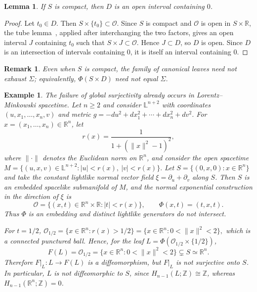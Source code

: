 \documentclass[11pt]{article}
\numberwithin{equation}{section}
\newtheorem{lemma}[theorem]{Lemma}
\newtheorem{remark}[theorem]{Remark}
\newtheorem{example}[theorem]{Example}
\begin{document}
	\begin{lemma}\label{lemma:compact-common-domain}
		If $S$ is compact, then $D$ is an open interval containing $0$.
	\end{lemma}

	\begin{proof}
		Let $t_0\in D$. Then $S\times\{t_0\}\subset\mathscr O$. Since $S$ is
		compact and $\mathscr O$ is open in $S\times\mathbb R$, the tube
		lemma~\cite[Lem.~26.8]{Munkres}, applied after interchanging the two
		factors, gives an open interval $J$ containing $t_0$ such that
		$S\times J\subset\mathscr O$. Hence $J\subset D$, so $D$ is open.
		Since $D$ is an intersection of intervals containing $0$, it is itself
		an interval containing $0$.
	\end{proof}

	\begin{remark}\normalfont
		Even when $S$ is compact, the family of canonical leaves need not
		exhaust $\Sigma$; equivalently, $\Phi(S\times D)$ need not equal
		$\Sigma$.
	\end{remark}

	\begin{example}\label{example:nonuniform-leaf-domain}
		\normalfont
		The failure of global surjectivity already occurs in Lorentz--Minkowski
spacetime. Let $n\ge2$ and consider $\mathbb L^{n+2}$ with coordinates
$(u,x_1,\ldots,x_n,v)$ and metric
\(g=-du^2+dx_1^2+\cdots+dx_n^2+dv^2\).
For \(x=(x_1,\ldots,x_n)\in\mathbb R^n\), let
\[
 r(x)=\frac{1}{1+(\|x\|^2-1)^2},
\]
where $\|\cdot\|$ denotes the Euclidean norm on $\mathbb R^n$, and consider
the open spacetime
\(
M=\{(u,x,v)\in\mathbb L^{n+2}:|u|<r(x),\ |v|<r(x)\}.
\)
Let \(S=\{(0,x,0):x\in\mathbb R^n\}\) and take the constant lightlike
normal vector field \(\xi=\partial_u+\partial_v\) along $S$. Then $S$ is
an embedded spacelike submanifold of $M$, and the normal exponential
construction in the direction of $\xi$ is
\[
 \mathscr O
 =
 \{(x,t)\in\mathbb R^n\times\mathbb R:|t|<r(x)\},
 \qquad
 \Phi(x,t)=(t,x,t).
\]
Thus $\Phi$ is an embedding and distinct lightlike generators do not
intersect.

For $t=1/2$,
\(
\mathscr O_{1/2}
=\{x\in\mathbb R^n:r(x)>1/2\}
=\{x\in\mathbb R^n:0<\|x\|^2<2\},
\)
which is a connected punctured ball. Hence, for the leaf
\(L=\Phi(\mathscr O_{1/2}\times\{1/2\})\),
\[
 F(L)=\mathscr O_{1/2}
 =\{x\in\mathbb R^n:0<\|x\|^2<2\}
 \subsetneq S\simeq\mathbb R^n.
\]
Therefore $F|_L\colon L\to F(L)$ is a diffeomorphism, but $F|_L$ is not
surjective onto $S$. In particular, $L$ is not diffeomorphic to $S$, since
\(H_{n-1}(L;\mathbb Z)\cong\mathbb Z\), whereas
\(H_{n-1}(\mathbb R^n;\mathbb Z)=0\).
	\end{example}
\end{document}
